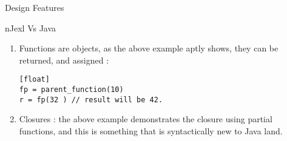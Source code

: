 \begin{section}{Design Features}
\begin{subsection}{nJexl Vs Java}
\begin{enumerate}
\item { Functions are objects, as the above example aptly shows, they can be returned, and assigned : 

\begin{lstlisting}[style=JexlStyle][float]
fp = parent_function(10) 
r = fp(32 ) // result will be 42.
\end{lstlisting}
}

\item{ Closures : the above example demonstrates the closure using partial functions, and this is something that is
syntactically new to Java land.}

\end{enumerate}

\end{subsection}

\end{section}

